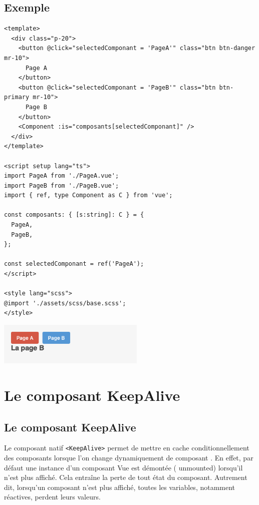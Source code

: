 \subsection{Exemple}
\begin{verbatim}
<template>
  <div class="p-20">
    <button @click="selectedComponant = 'PageA'" class="btn btn-danger mr-10">
      Page A
    </button>
    <button @click="selectedComponant = 'PageB'" class="btn btn-primary mr-10">
      Page B
    </button>
    <Component :is="composants[selectedComponant]" />
  </div>
</template>

<script setup lang="ts">
import PageA from './PageA.vue';
import PageB from './PageB.vue';
import { ref, type Component as C } from 'vue';

const composants: { [s:string]: C } = {
  PageA,
  PageB,
};

const selectedComponant = ref('PageA');
</script>

<style lang="scss">
@import './assets/scss/base.scss';
</style>
\end{verbatim}
\begin{center}
\includegraphics[width=7cm]{images/image29.png}
\end{center}

\section{Le composant KeepAlive}
\subsection{Le composant {\color{monOrange}KeepAlive}}
Le composant natif {\tt <KeepAlive>} permet de mettre en cache conditionnellement des composants lorsque l'on change dynamiquement de composant . En effet, par défaut une instance d'un composant {\color{monOrange}Vue} est démontée ( {\color{monOrange}unmounted}) lorsqu'il n'est plus affiché. Cela entraîne la perte de tout état du composant. Autrement dit, lorsqu'un composant n'est plus affiché, toutes les variables, notamment réactives, perdent leurs valeurs.

